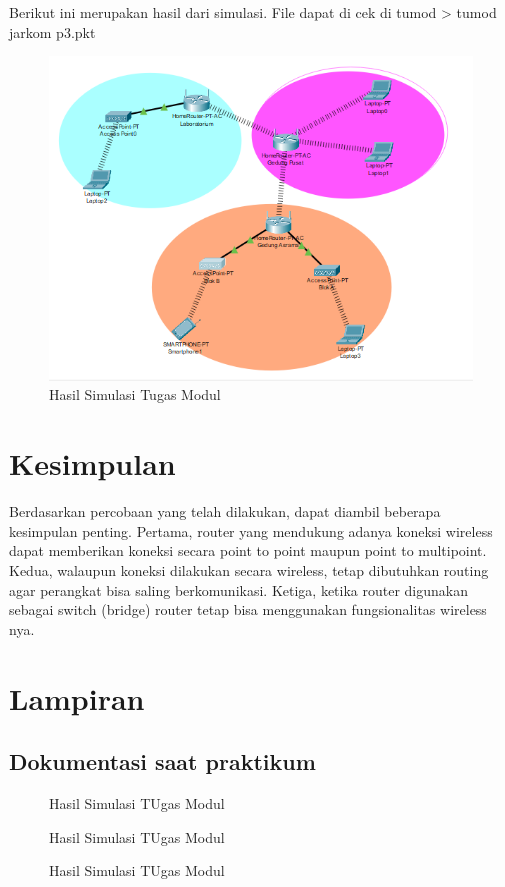 Berikut ini merupakan hasil dari simulasi. File dapat di cek di tumod > tumod jarkom p3.pkt
\begin{figure}[htbp]
    \centering
    \includegraphics[width=\linewidth]{tumod/tumod jarkom3.png} 
    \caption{Hasil Simulasi Tugas Modul}
    \label{fig:tumod}
\end{figure}



\section{Kesimpulan}
Berdasarkan percobaan yang telah dilakukan, dapat diambil beberapa kesimpulan penting. Pertama, router yang mendukung adanya koneksi wireless dapat memberikan koneksi secara point to point maupun point to multipoint. Kedua, walaupun koneksi dilakukan secara wireless, tetap dibutuhkan routing agar perangkat bisa saling berkomunikasi. Ketiga, ketika router digunakan sebagai switch (bridge) router tetap bisa menggunakan fungsionalitas wireless nya.

\section{Lampiran}
\subsection{Dokumentasi saat praktikum}
\begin{figure}[htbp]
    \centering
    \caption{Hasil Simulasi TUgas Modul}
    \label{fig:tumod}
\end{figure}

\begin{figure}[htbp]
    \centering
    \caption{Hasil Simulasi TUgas Modul}
    \label{fig:tumod}
\end{figure}

\begin{figure}[htbp]
    \centering
    \caption{Hasil Simulasi TUgas Modul}
    \label{fig:tumod}
\end{figure}



